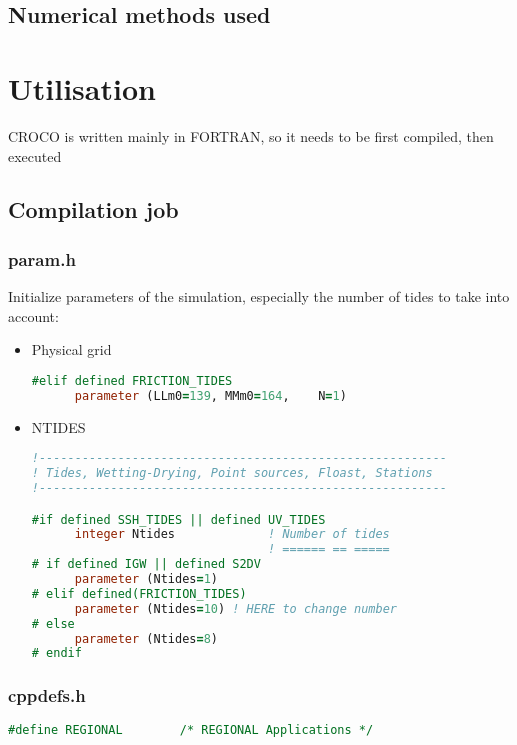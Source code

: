 \documentclass{article}
\begin{document}
\subsection{Numerical methods used}
\section{Utilisation}
CROCO is written mainly in FORTRAN, so it needs to be first compiled, then executed
\subsection{Compilation job}
\subsubsection{param.h}
Initialize parameters of the simulation, especially the number of tides to take into account:
\begin{itemize}
\item Physical grid
  \begin{lstlisting}[language=Fortran]
    #elif defined FRICTION_TIDES
      parameter (LLm0=139, MMm0=164,    N=1) 
    \end{lstlisting}
  \item NTIDES
    \begin{lstlisting}[language=Fortran]
!---------------------------------------------------------
! Tides, Wetting-Drying, Point sources, Floast, Stations
!---------------------------------------------------------

#if defined SSH_TIDES || defined UV_TIDES
      integer Ntides             ! Number of tides
                                 ! ====== == =====
# if defined IGW || defined S2DV
      parameter (Ntides=1)
# elif defined(FRICTION_TIDES)
      parameter (Ntides=10) ! HERE to change number
# else
      parameter (Ntides=8)
# endif
\end{lstlisting}

\end{itemize}
\subsubsection{cppdefs.h}
\begin{lstlisting}[language=Fortran]
#define REGIONAL        /* REGIONAL Applications */
\end{lstlisting}
\end{document}
